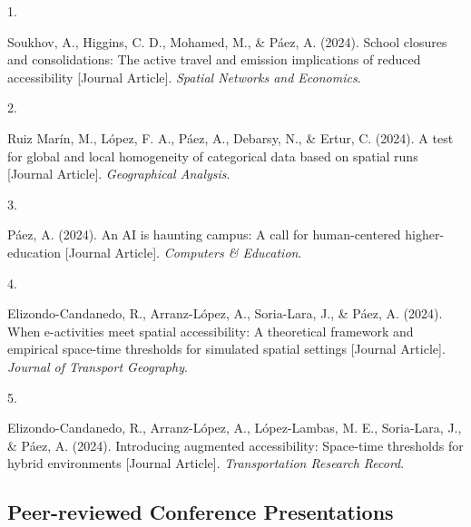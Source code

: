\documentclass[11pt,a4paper,]{awesome-cv}
\newlength{\cslhangindent}
\newlength{\csllabelwidth}
\newenvironment{CSLReferences}[2] %
 {\begin{list}{}{%
  \setlength{\itemindent}{0pt}
  \setlength{\leftmargin}{0pt}
  \setlength{\parsep}{0pt}
  \ifodd #1
   \setlength{\leftmargin}{\cslhangindent}
   \setlength{\itemindent}{-1\cslhangindent}
  \fi
  \setlength{\itemsep}{#2\baselineskip}}}
 {\end{list}}
\newcommand{\CSLLeftMargin}[1]{\parbox[t]{\csllabelwidth}{\strut#1\strut}}
\newcommand{\CSLRightInline}[1]{\parbox[t]{\linewidth - \csllabelwidth}{\strut#1\strut}}
\begin{document}
\label{refs-f91617909dc8d3b410c607967cbe3581}
\begin{CSLReferences}{0}{0}
\CSLLeftMargin{1. }%
\CSLRightInline{Soukhov, A., Higgins, C. D., Mohamed, M., \& Páez, A.
(2024). School closures and consolidations: The active travel and
emission implications of reduced accessibility {[}Journal Article{]}.
\emph{Spatial Networks and Economics}.}

\CSLLeftMargin{2. }%
\CSLRightInline{Ruiz Marín, M., López, F. A., Páez, A., Debarsy, N., \&
Ertur, C. (2024). A test for global and local homogeneity of categorical
data based on spatial runs {[}Journal Article{]}. \emph{Geographical
Analysis}.}

\CSLLeftMargin{3. }%
\CSLRightInline{Páez, A. (2024). An AI is haunting campus: A call for
human-centered higher-education {[}Journal Article{]}. \emph{Computers
\& Education}.}

\CSLLeftMargin{4. }%
\CSLRightInline{Elizondo-Candanedo, R., Arranz-López, A., Soria-Lara,
J., \& Páez, A. (2024). When e-activities meet spatial accessibility: A
theoretical framework and empirical space-time thresholds for simulated
spatial settings {[}Journal Article{]}. \emph{Journal of Transport
Geography}.}

\CSLLeftMargin{5. }%
\CSLRightInline{Elizondo-Candanedo, R., Arranz-López, A., López-Lambas,
M. E., Soria-Lara, J., \& Páez, A. (2024). Introducing augmented
accessibility: Space-time thresholds for hybrid environments {[}Journal
Article{]}. \emph{Transportation Research Record}.}

\end{CSLReferences}

\subsection{Peer-reviewed Conference
Presentations}\label{peer-reviewed-conference-presentations}
\end{document}
